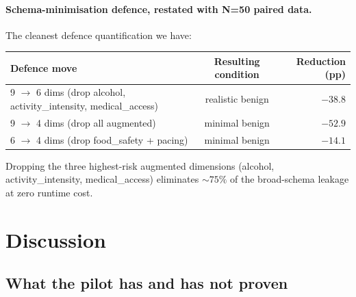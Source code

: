 \documentclass[11pt,a4paper]{article}
\begin{document}
\paragraph{Schema-minimisation defence, restated with N=50 paired data.}
The cleanest defence quantification we have:

\begin{center}
\small
\begin{tabular}{l c r}
\toprule
Defence move & Resulting condition & Reduction (pp) \\
\midrule
9 $\to$ 6 dims (drop alcohol, activity\_intensity, medical\_access) & realistic benign & $-38.8$ \\
9 $\to$ 4 dims (drop all augmented) & minimal benign & $\bm{-52.9}$ \\
6 $\to$ 4 dims (drop food\_safety + pacing) & minimal benign & $-14.1$ \\
\bottomrule
\end{tabular}
\end{center}

Dropping the three highest-risk augmented dimensions (alcohol,
activity\_intensity, medical\_access) eliminates $\sim 75\%$ of the
broad-schema leakage at zero runtime cost.

\section{Discussion}
\label{sec:discussion}

\subsection{What the pilot has and has not proven}
\end{document}
